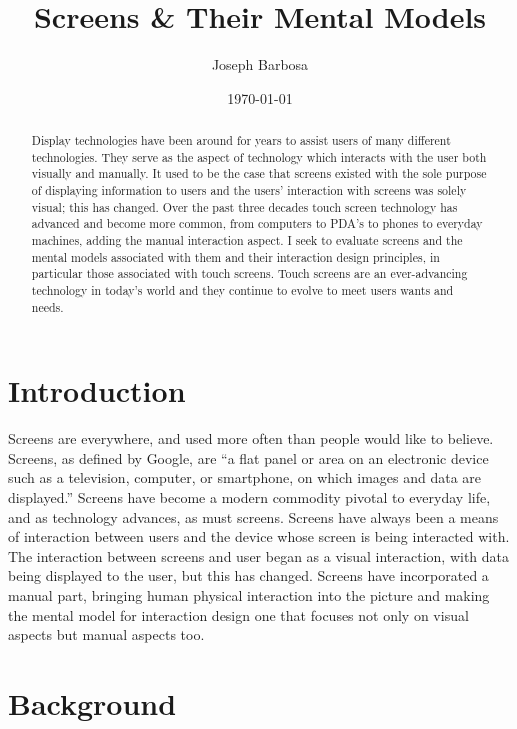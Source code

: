 \documentclass[12pt]{article} %
\title{Screens \& Their Mental Models}
\author{Joseph Barbosa}
\date{\today}
\begin{document}
\maketitle

\begin{abstract}

     Display technologies have been around for years to assist users of many different technologies. They serve as the aspect of technology which interacts with the user both visually and manually. It used to be the case that screens existed with the sole purpose of displaying information to users and the users' interaction with screens was solely visual; this has changed. Over the past three decades touch screen technology has advanced and become more common, from computers to PDA's to phones to everyday machines, adding the manual interaction aspect. I seek to evaluate screens and the mental models associated with them and their interaction design principles, in particular those associated with touch screens. Touch screens are an ever-advancing technology in today's world and they continue to evolve to meet users wants and needs.

\end{abstract}

\section{Introduction}

     Screens are everywhere, and used more often than people would like to believe. Screens, as defined by Google, are ``a flat panel or area on an electronic device such as a television, computer, or smartphone, on which images and data are displayed.'' Screens have become a modern commodity pivotal to everyday life, and as technology advances, as must screens. Screens have always been a means of interaction between users and the device whose screen is being interacted with. The interaction between screens and user began as a visual interaction, with data being displayed to the user, but this has changed. Screens have incorporated a manual part, bringing human  physical interaction into the picture and making the mental model for interaction design one that focuses not only on visual aspects but manual aspects too. 

\section{Background}
\end{document}
